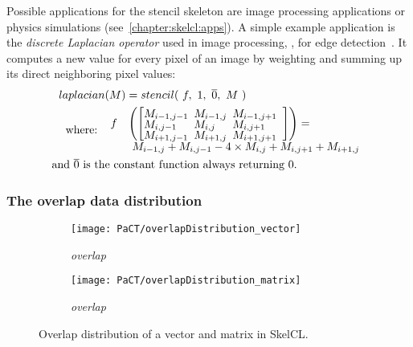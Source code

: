 Possible applications for the stencil skeleton are image processing applications or physics simulations (see~\autoref{chapter:skelcl:apps}).
A simple example application is the \emph{discrete Laplacian operator} used in image processing, \eg, for edge detection~\cite{Umbaugh1997}.
It computes a new value for every pixel of an image by weighting and summing up its direct neighboring pixel values:
\begin{align*}
  laplacian&(M) = stencil(\ f,\ 1,\ \overline{0},\ M\ )\\
  \text{where:} \ \ &
  \begin{array}{ll}%
  f &\left(\left[\begin{array}{lll}%
      \hspace{-.5em} M_{i-1,j-1}& \hspace{-.5em} M_{i-1,j} & \hspace{-.5em}M_{i-1,j+1}\vspace{-.25em}\\%
      \hspace{-.5em} M_{i,j-1}& \hspace{-.5em} M_{i,j} & \hspace{-.5em}M_{i,j+1}\vspace{-.25em}\\%
      \hspace{-.5em} M_{i+1,j-1}& \hspace{-.5em} M_{i+1,j} & \hspace{-.5em}M_{i+1,j+1}\vspace{-.25em}
    \end{array}\right] \right) = \\
          &\ M_{i-1,j} + M_{i,j-1} - 4 \times M_{i,j} + M_{i,j+1} + M_{i+1,j}
  \end{array} \\
  \text{and } \overline{0} \text{ is th}&\text{e constant function always returning 0.}
\end{align*}

\subsubsection{The overlap data distribution}

\begin{figure}[tb]
  \centering
  \begin{subfigure}[b]{.3\textwidth}
    \texttt{[image: PaCT/overlapDistribution\_vector]}
    \caption{\emph{overlap}}
    \label{fig:overlap_distribution}
  \end{subfigure}
  \hspace{3em}
  \begin{subfigure}[b]{.22\textwidth}
    \texttt{[image: PaCT/overlapDistribution\_matrix]}
    \caption{\emph{overlap}}
    \label{fig:overlap_distribution:matrix}
  \end{subfigure}
  \caption{Overlap distribution of a vector and matrix in SkelCL.}
  \label{fig:overlap_distribution}
  \bigskip
\end{figure}

